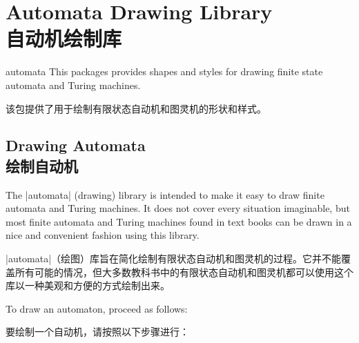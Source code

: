 \setcounter{section}{42}
\setcounter{subsection}{0}
\setcounter{subsubsection}{0}

%
%
%


\section{Automata Drawing Library\\自动机绘制库}

\begin{tikzlibrary}{automata}
    This packages provides shapes and styles for drawing finite state automata
    and Turing machines.

    该包提供了用于绘制有限状态自动机和图灵机的形状和样式。


\end{tikzlibrary}


\subsection{Drawing Automata\\绘制自动机}

The |automata| (drawing) library is intended to make it easy to draw finite
automata and Turing machines. It does not cover every situation imaginable, but
most finite automata and Turing machines found in text books can be drawn in a
nice and convenient fashion using this library.

|automata|（绘图）库旨在简化绘制有限状态自动机和图灵机的过程。它并不能覆盖所有可能的情况，但大多数教科书中的有限状态自动机和图灵机都可以使用这个库以一种美观和方便的方式绘制出来。

To draw an automaton, proceed as follows:

要绘制一个自动机，请按照以下步骤进行：

